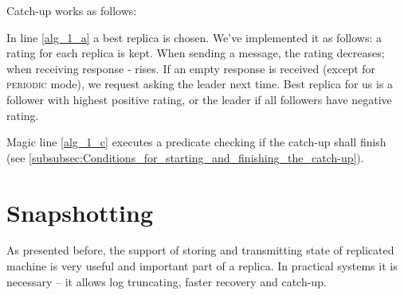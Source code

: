 Catch-up works as follows:

%  
%  
%
%  
%

\vspace{1em}

In line \ref{alg_1_a} a best replica is chosen. We've implemented it as follows: a rating for each replica is kept. When sending a message, the rating decreases; when receiving response - rises. If an empty response is received (except for \textsc{periodic} mode), we request asking the leader next time. Best replica for us is a follower with highest positive rating, or the leader if all followers have negative rating.

Magic line \ref{alg_1_c} executes a predicate checking if the catch-up shall finish (see \ref{subsubsec:Conditions_for_starting_and_finishing_the_catch-up}).

\section{Snapshotting}
\label{sec:Snapshotting}
As presented before, the support of storing and transmitting state of replicated machine is very useful and important part of a replica. In practical systems it is necessary -- it allows log truncating, faster recovery and catch-up.


